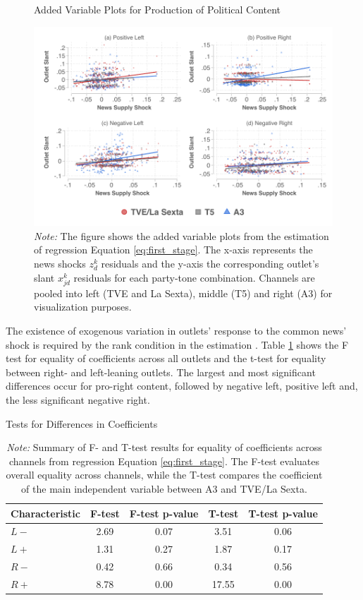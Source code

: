 \documentclass[12pt]{article}
\begin{document}
\begin{figure}[!htb]
	\centering
	\caption{Added Variable Plots for Production of Political Content}
	\includegraphics[width=160mm]{figures/fwl_plots_v2}
	\caption*{\small \textit{Note:} The figure shows the added variable plots from the estimation of regression Equation \eqref{eq:first_stage}. The x-axis represents the news shocks $z_d^k $ residuals and the y-axis the corresponding outlet's slant $x_{jd}^k $ residuals for each party-tone combination. Channels are pooled into left (TVE and La Sexta), middle (T5) and right (A3) for visualization purposes.  }
	\label{fig:fwl}
\end{figure}

The existence of exogenous variation in outlets' response to the common news' shock is required by the rank condition in the estimation \citep{berry_haile_econometrica}.  Table \ref{tab:tests}   shows the F test for equality of coefficients across all outlets and the t-test for equality between right- and left-leaning outlets. The largest and most significant differences occur for pro-right content, followed by negative left, positive left and, the less significant negative right. 



\begin{table}[!htbp]
	\centering
	
	
	\caption{Tests for Differences in Coefficients}
	\begin{tabular}{lcccc}
		\hline
		Characteristic & F-test  & F-test p-value & T-test  & T-test p-value \\
		\hline
		$ {L-}$& 2.69 & 0.07 & 3.51  & 0.06 \\
		$ {L+}$ & 1.31 & 0.27 & 1.87  & 0.17 \\
		$ {R-}$ & 0.42 & 0.66 & 0.34 & 0.56 \\
		$ {R+}$ & 8.78 & 0.00 & 17.55  & 0.00 \\
		\hline
	\end{tabular}
	\caption*{\small \textit{Note:} Summary of F- and T-test results for equality of coefficients across channels from regression Equation \eqref{eq:first_stage}. The F-test evaluates overall equality across channels, while the T-test compares the coefficient of the main independent variable between A3 and TVE/La Sexta.}
	\label{tab:tests}
\end{table}
\end{document}

